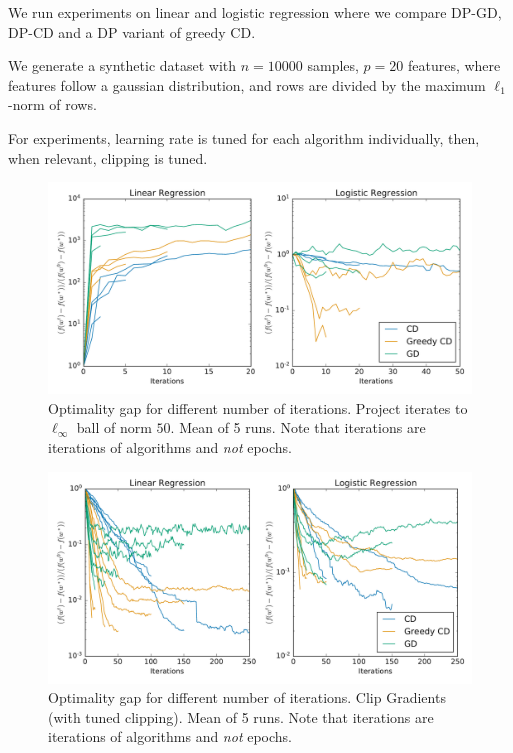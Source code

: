 \documentclass[notheorems]{beamer}
\begin{document}
\begin{frame}
  We run experiments on linear and logistic regression where we compare DP-GD, DP-CD and a DP variant of greedy CD.

  \vspace{1em}

  We generate a synthetic dataset with $n=10000$ samples, $p=20$ features, where features follow a gaussian distribution, and rows are divided by the maximum $\ell_1$-norm of rows.

  For experiments, learning rate is tuned for each algorithm individually, then, when relevant, clipping is tuned.
\end{frame}

\begin{frame}
  \begin{figure}
    \centering
    \includegraphics[width=1.0\linewidth]{images/cdvsgd_normal.pdf}
    \caption{Optimality gap for different number of iterations. Project iterates to $\ell_\infty$ ball of norm $50$. Mean of 5 runs. Note that iterations are iterations of algorithms and \textit{not} epochs.}
  \end{figure}
\end{frame}

\begin{frame}
  \begin{figure}
    \centering
    \includegraphics[width=1.0\linewidth]{images/cdvsgd_clipped.pdf}
    \caption{Optimality gap for different number of iterations. Clip Gradients (with tuned clipping). Mean of 5 runs. Note that iterations are iterations of algorithms and \textit{not} epochs.}
  \end{figure}
\end{frame}
\end{document}
